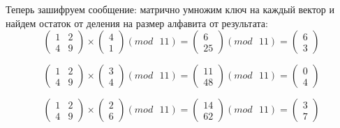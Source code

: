 \documentclass[a5paper, 10pt]{article}
\theoremstyle{definition}
\theoremstyle{plain}
\theoremstyle{remark}
\begin{document}
Теперь зашифруем сообщение: матрично умножим ключ на каждый вектор и найдем остаток от деления на размер алфавита от результата:
\begin{equation}
\begin{pmatrix}
1 & 2 \\
4 & 9
\end{pmatrix}
 \times
\begin{pmatrix}
 4\\
1
\end{pmatrix}
(mod \text{ }11)
= 
\begin{pmatrix}
 6\\
25
\end{pmatrix}
(mod \text{ }11)
= \begin{pmatrix}
 6\\
3
\end{pmatrix}
\end{equation}

\begin{equation}
\begin{pmatrix}
1 & 2 \\
4 & 9
\end{pmatrix}
 \times
\begin{pmatrix}
 3\\
4
\end{pmatrix}
(mod \text{ }11)
= 
\begin{pmatrix}
 11\\
48
\end{pmatrix}
(mod \text{ }11)
= \begin{pmatrix}
 0\\
4
\end{pmatrix}
\end{equation}

\begin{equation}
\begin{pmatrix}
1 & 2 \\
4 & 9
\end{pmatrix}
 \times
\begin{pmatrix}
 2\\
6
\end{pmatrix}
(mod \text{ }11)
= 
\begin{pmatrix}
 14\\
62
\end{pmatrix}
(mod \text{ }11)
= \begin{pmatrix}
 3\\
7
\end{pmatrix}
\end{equation}
\end{document}
